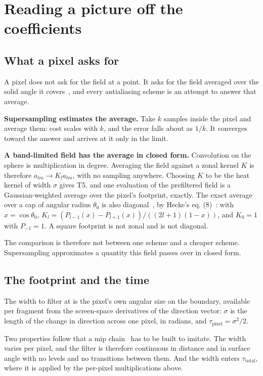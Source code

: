 \section{Reading a picture off the coefficients}

\subsection{What a pixel asks for}

A pixel does not ask for the field at a point. It asks for the field averaged over the solid angle it covers~\cite{src:Ramamoorthi-and-Hanrahan-2001}, and every antialiasing scheme is an attempt to answer that average.

\textbf{Supersampling estimates the average.} Take \(k\) samples inside the pixel and average them: cost scales with \(k\), and the error falls about as \(1/k\). It converges toward the answer and arrives at it only in the limit.

\textbf{A band-limited field has the average in closed form.} Convolution on the sphere is multiplication in degree. Averaging the field against a zonal kernel \(K\) is therefore \(a_{lm} \to K_l a_{lm}\), with no sampling anywhere. Choosing \(K\) to be the heat kernel of width \(\sigma\) gives T5, and one evaluation of the prefiltered field is a Gaussian-weighted average over the pixel's footprint, exactly. The exact average over a cap of angular radius \(\theta_0\) is also diagonal~\cite[Part~1]{src:Funk-1915}, by Hecke's eq. (8)~\cite[Section~3]{src:Hecke-1917}: with \(x = \cos\theta_0\), \(K_l = (P_{l-1}(x) - P_{l+1}(x)) / ((2l+1)(1-x))\), and \(K_0 = 1\) with \(P_{-1} = 1\). A square footprint is not zonal and is not diagonal.

The comparison is therefore not between one scheme and a cheaper scheme. Supersampling approximates a quantity this field passes over in closed form.

\subsection{The footprint and the time}

The width to filter at is the pixel's own angular size on the boundary, available per fragment from the screen-space derivatives of the direction vector: \(\sigma\) is the length of the change in direction across one pixel, in radians, and \(\tau_{\text{pixel}} = \sigma^2/2\).

Two properties follow that a mip chain~\cite{src:Williams-1983} has to be built to imitate. The width varies per pixel, and the filter is therefore continuous in distance and in surface angle with no levels and no transitions between them. And the width enters \(\tau_{\text{total}}\), where it is applied by the per-pixel multiplications above.


